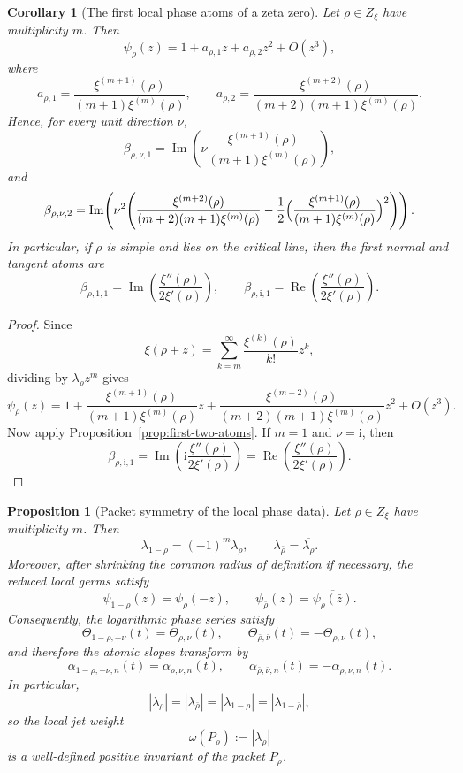 \documentclass[11pt,a4paper]{article}
\numberwithin{equation}{section}
\newtheorem{proposition}[theorem]{Proposition}
\newtheorem{corollary}[theorem]{Corollary}
\theoremstyle{definition}
\theoremstyle{remark}
\DeclareMathOperator{\Rea}{Re}
\DeclareMathOperator{\Ima}{Im}
\newcommand{\ii}{\mathrm i}
\begin{document}
\begin{corollary}[The first local phase atoms of a zeta zero]\label{cor:zeta-first-atoms}
Let $\rho\in Z_\xi$ have multiplicity $m$.  Then
\[
\psi_\rho(z)=1+a_{\rho,1} z+a_{\rho,2} z^2+O(z^3),
\]
where
\[
a_{\rho,1}=\frac{\xi^{(m+1)}(\rho)}{(m+1)\xi^{(m)}(\rho)},
\qquad
a_{\rho,2}=\frac{\xi^{(m+2)}(\rho)}{(m+2)(m+1)\xi^{(m)}(\rho)}.
\]
Hence, for every unit direction $\nu$,
\[
\beta_{\rho,\nu,1}=\Ima\!\left(\nu\frac{\xi^{(m+1)}(\rho)}{(m+1)\xi^{(m)}(\rho)}\right),
\]
and
\[
\beta_{\rho,\nu,2}=\Ima\!\left(\nu^2\Biggl(\frac{\xi^{(m+2)}(\rho)}{(m+2)(m+1)\xi^{(m)}(\rho)}-
\frac12\Bigl(\frac{\xi^{(m+1)}(\rho)}{(m+1)\xi^{(m)}(\rho)}\Bigr)^2\Biggr)\right).
\]
In particular, if $\rho$ is simple and lies on the critical line, then the first normal and tangent atoms are
\[
\beta_{\rho,1,1}=\Ima\!\left(\frac{\xi''(\rho)}{2\xi'(\rho)}\right),
\qquad
\beta_{\rho,\ii,1}=\Rea\!\left(\frac{\xi''(\rho)}{2\xi'(\rho)}\right).
\]
\end{corollary}

\begin{proof}
Since
\[
\xi(\rho+z)=\sum_{k=m}^{\infty}\frac{\xi^{(k)}(\rho)}{k!}z^k,
\]
dividing by $\lambda_\rho z^m$ gives
\[
\psi_\rho(z)=1+
\frac{\xi^{(m+1)}(\rho)}{(m+1)\xi^{(m)}(\rho)}z+
\frac{\xi^{(m+2)}(\rho)}{(m+2)(m+1)\xi^{(m)}(\rho)}z^2+O(z^3).
\]
Now apply Proposition~\ref{prop:first-two-atoms}.  If $m=1$ and $\nu=\ii$, then
\[
\beta_{\rho,\ii,1}=\Ima\!\left(\ii\frac{\xi''(\rho)}{2\xi'(\rho)}\right)=\Rea\!\left(\frac{\xi''(\rho)}{2\xi'(\rho)}\right).
\]
\end{proof}

\begin{proposition}[Packet symmetry of the local phase data]\label{prop:packet-symmetry-local}
Let $\rho\in Z_\xi$ have multiplicity $m$.  Then
\[
\lambda_{1-\rho}=(-1)^m\lambda_\rho,
\qquad
\lambda_{\bar\rho}=\overline{\lambda_\rho}.
\]
Moreover, after shrinking the common radius of definition if necessary, the reduced local germs satisfy
\[
\psi_{1-\rho}(z)=\psi_\rho(-z),
\qquad
\psi_{\bar\rho}(z)=\overline{\psi_\rho(\bar z)}.
\]
Consequently, the logarithmic phase series satisfy
\[
\Theta_{1-\rho,-\nu}(t)=\Theta_{\rho,\nu}(t),
\qquad
\Theta_{\bar\rho,\bar\nu}(t)=-\Theta_{\rho,\nu}(t),
\]
and therefore the atomic slopes transform by
\[
\alpha_{1-\rho,-\nu,n}(t)=\alpha_{\rho,\nu,n}(t),
\qquad
\alpha_{\bar\rho,\bar\nu,n}(t)=-\alpha_{\rho,\nu,n}(t).
\]
In particular,
\[
|\lambda_{\rho}|=|\lambda_{\bar\rho}|=|\lambda_{1-\rho}|=|\lambda_{1-\bar\rho}|,
\]
so the local jet weight
\[
\omega(P_\rho):=|\lambda_\rho|
\]
is a well-defined positive invariant of the packet $P_\rho$.
\end{proposition}
\end{document}
